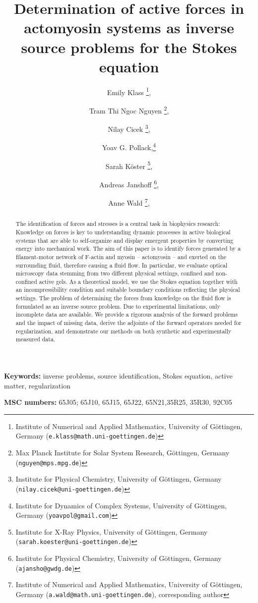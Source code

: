 \documentclass[final,leqno]{scrarticle}
\author{Emily Klass \thanks{Institute of Numerical and Applied Mathematics, University of G\"ottingen, Germany (\texttt{e.klass@math.uni-goettingen.de})}, \and Tram Thi Ngoc Nguyen \thanks{Max Planck Institute for Solar System Research, G\"ottingen, Germany (\texttt{nguyen@mps.mpg.de})},
\and Nilay Cicek \thanks{Institute for Physical Chemistry, University of G\"ottingen, Germany (\texttt{nilay.cicek@uni-goettingen.de})},
\and Yoav G. Pollack,\thanks{Institute for Dynamics of Complex Systems, University of Göttingen, Germany (\texttt{yoavpol@gmail.com})} 
\and Sarah K\"oster \thanks{Institute for X-Ray Physics, University of G\"ottingen, Germany (\texttt{sarah.koester@uni-goettingen.de})}, 
\and Andreas Janshoff \thanks{Institute for Physical Chemistry, University of G\"ottingen, Germany (\texttt{ajansho@gwdg.de})}, 
\and Anne Wald \thanks{Institute of Numerical and Applied Mathematics, University of G\"ottingen, Germany (\texttt{a.wald@math.uni-goettingen.de}),  corresponding author},}
\title{Determination of active forces in actomyosin systems as inverse source problems for the Stokes equation}
\newcommand{\tc}[1]{\begin{quotation}\textbf{Tram's comment:\
}{\textit{#1}}\end{quotation}}
\begin{document}
\maketitle

\begin{abstract}
 The identification of forces and stresses is a central task in biophysics research: Knowledge on forces is key to understanding dynamic processes in active biological systems that are able to self-organize and display emergent properties by converting energy into mechanical work. The aim of this paper is to identify forces generated by a filament-motor network of F-actin and myosin -- actomyosin --  and exerted on the surrounding fluid, therefore causing a fluid flow. In particular, we evaluate optical microscopy data stemming from two different physical settings, confined and non-confined active gels. As a theoretical model, we use the Stokes equation together with an incompressibility condition and suitable boundary conditions reflecting the physical settings. The problem of determining the forces from knowledge on the fluid flow is formulated as an inverse source problem. Due to experimental limitations, only incomplete data are available. We provide a rigorous analysis of the forward problems and the impact of missing data, derive the adjoints of the forward operators needed for regularization, and demonstrate our methods on both synthetic and experimentally measured data.  
\end{abstract}

 \vspace{2ex}

\textbf{Keywords:} 
 inverse problems, source identification, Stokes equation, active matter, regularization

 \vspace{2ex}

 \textbf{MSC numbers:}
% 
65J05; 65J10, 65J15, 65J22, 65N21,35R25, 35R30, 92C05

\end{document}
